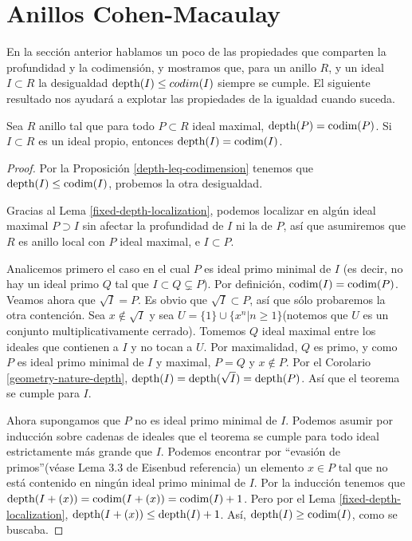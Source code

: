 \section{Anillos Cohen-Macaulay}

En la sección anterior hablamos un poco de las propiedades que comparten la profundidad y la codimensión, y mostramos que, para un anillo $R$, y un ideal $I \subset R$ la desigualdad $\textrm{depth}(I) \leq codim(I)$ siempre se cumple. El siguiente resultado nos ayudará a explotar las propiedades de la igualdad cuando suceda.

\begin{theorem}\label{cohen-macaulay-well-definition}
Sea $R$ anillo tal que para todo $P\subset R$ ideal maximal, $\textrm{depth}(P) = \textrm{codim}(P)$. Si $I \subset R$ es un ideal propio, entonces $\textrm{depth}(I) = \textrm{codim}(I)$.
\end{theorem}

\begin{proof}
Por la Proposición \ref{depth-leq-codimension} tenemos que $\textrm{depth}(I) \leq \textrm{codim}(I)$, probemos la otra desigualdad.

Gracias al Lema \ref{fixed-depth-localization}, podemos localizar en algún ideal maximal $P \supset I$ sin afectar la profundidad de $I$ ni la de $P$, así que asumiremos que $R$ es anillo local con $P$ ideal maximal, e $I \subset P$. 

Analicemos primero el caso en el cual $P$ es ideal primo minimal de $I$ (es decir, no hay un ideal primo $Q$ tal que $I \subset Q \subsetneq P$). Por definición, $\textrm{codim}(I) = \textrm{codim}(P)$. Veamos ahora que $\sqrt{I} = P$. Es obvio que $\sqrt{I} \subset P$, así que sólo probaremos la otra contención. Sea $x \not\in \sqrt{I}$ y sea $U = \{1\}\cup\{x^n|n \geq 1\}$(notemos que $U$ es un conjunto multiplicativamente cerrado). Tomemos $Q$ ideal maximal entre los ideales que contienen a $I$ y no tocan a $U$. Por maximalidad, $Q$ es primo, y como $P$ es ideal primo minimal de $I$ y maximal, $P = Q$ y $x \not\in P$. Por el Corolario \ref{geometry-nature-depth}, $\textrm{depth}(I) = \textrm{depth}(\sqrt{I}) = \textrm{depth}(P)$. Así que el teorema se cumple para $I$.

Ahora supongamos que $P$ no es ideal primo minimal de $I$. Podemos asumir por inducción sobre cadenas de ideales que el teorema se cumple para todo ideal estrictamente más grande que $I$. Podemos encontrar por ``evasión de primos''(véase Lema 3.3 de Eisenbud referencia) un elemento $x \in P$ tal que no está contenido en ningún ideal primo minimal de $I$. Por la inducción tenemos que $\textrm{depth}(I + (x)) = \textrm{codim}(I + (x)) = \textrm{codim}(I) + 1$. Pero por el Lema \ref{fixed-depth-localization}, $\textrm{depth}(I + (x)) \leq \textrm{depth}(I) + 1$. Así, $\textrm{depth}(I) \geq \textrm{codim}(I)$, como se buscaba.
\end{proof}

